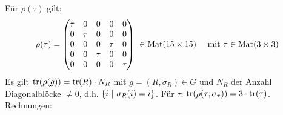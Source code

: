 Für $\rho(\tau)$ gilt:
\begin{align*}
    \rho(\tau) = \begin{pmatrix}
        \tau & 0 & 0 & 0 & 0 \\
        0 & \tau & 0 & 0 & 0 \\
        0 & 0 & 0 & \tau & 0 \\
        0 & 0 & \tau & 0 & 0 \\
        0 & 0 & 0 & 0 & \tau
    \end{pmatrix}
    \ \in \text{Mat}(15 \times 15)
    \hspace{10pt} \text{ mit } \tau \in \text{Mat}(3 \times 3)
\end{align*}
Es gilt $\text{tr}(\rho(g)) = \text{tr}(R) \cdot N_R$ mit $g = (R,\sigma_R) \in G$
und $N_R$ der Anzahl Diagonalblöcke $\neq 0$, d.h. $\left\{ 
i \ | \ \sigma_R (i) = i \right\}$. Für $\tau$: $\text{tr}(\rho(\tau,\sigma_\tau)) = 3 \cdot
\text{tr}(\tau)$. Rechnungen:
